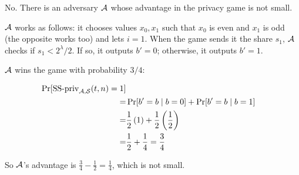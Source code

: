 \begin{answer}
    No. There is an adversary $\mathcal{A}$ whose advantage in the privacy game 
    is not small. 
    
    $\mathcal{A}$ works as follows: it chooses values $x_0, x_1$ such that $x_0$ 
    is even and $x_1$ is odd (the opposite works too) and lets $i=1$. 
    When the game sends it the share $s_1$, $\mathcal{A}$ checks if $s_1 < 2^\lambda/2$. 
    If so, it outputs $b'=0$; otherwise, it outputs $b'=1$.

    $\mathcal{A}$ wins the game with probability $3/4$:

    \begin{align*}
        \Pr[\text{SS-priv}_{\mathcal{A},\mathcal{S}}(t,n) = 1] \\
        =& \Pr[b'=b \mid b=0] + \Pr[b'=b \mid b=1]\\
        =& \frac{1}{2}\left(1\right) + \frac{1}{2}\left(\frac{1}{2}\right)\\
        =& \frac{1}{2} + \frac{1}{4} = \frac{3}{4}
    \end{align*}
    \smallskip

    So $\mathcal{A}$'s advantage is $\frac{3}{4}-\frac{1}{2} = \frac{1}{4}$, which 
    is not small.
\end{answer}

